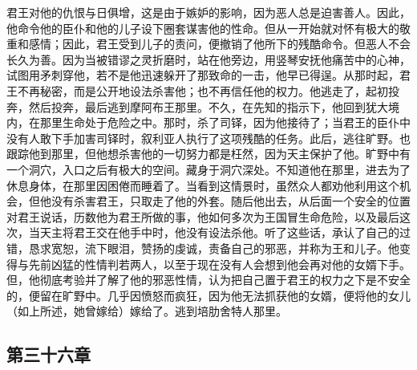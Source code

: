 君王对他的仇恨与日俱增，这是由于嫉妒的影响，因为恶人总是迫害善人。因此，他命令他的臣仆和他的儿子设下圈套谋害他的性命。但从一开始就对怀有极大的敬重和感情；因此，君王受到儿子的责问，便撤销了他所下的残酷命令。但恶人不会长久为善。因为当被错谬之灵折磨时，站在他旁边，用竖琴安抚他痛苦中的心神，试图用矛刺穿他，若不是他迅速躲开了那致命的一击，他早已得逞。从那时起，君王不再秘密，而是公开地设法杀害他；也不再信任他的权力。他逃走了，起初投奔，然后投奔，最后逃到摩阿布王那里。不久，在先知的指示下，他回到犹大境内，在那里生命处于危险之中。那时，杀了司铎，因为他接待了；当君王的臣仆中没有人敢下手加害司铎时，叙利亚人执行了这项残酷的任务。此后，逃往旷野。也跟踪他到那里，但他想杀害他的一切努力都是枉然，因为天主保护了他。旷野中有一个洞穴，入口之后有极大的空间。藏身于洞穴深处。不知道他在那里，进去为了休息身体，在那里因困倦而睡着了。当看到这情景时，虽然众人都劝他利用这个机会，但他没有杀害君王，只取走了他的外套。随后他出去，从后面一个安全的位置对君王说话，历数他为君王所做的事，他如何多次为王国冒生命危险，以及最后这次，当天主将君王交在他手中时，他没有设法杀他。听了这些话，承认了自己的过错，恳求宽恕，流下眼泪，赞扬的虔诚，责备自己的邪恶，并称为王和儿子。他变得与先前凶猛的性情判若两人，以至于现在没有人会想到他会再对他的女婿下手。但，他彻底考验并了解了他的邪恶性情，认为把自己置于君王的权力之下是不安全的，便留在旷野中。几乎因愤怒而疯狂，因为他无法抓获他的女婿，便将他的女儿（如上所述，她曾嫁给）嫁给了。逃到培肋舍特人那里。\par


\subsection{第三十六章}

